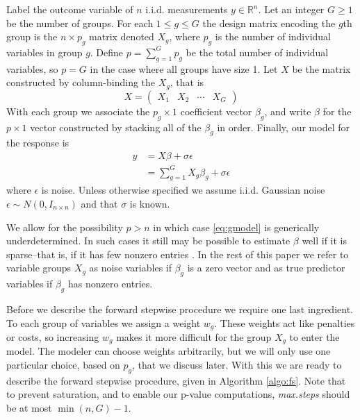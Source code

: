 \documentclass{imsart}
\newcommand{\todo}{\textcolor{red}{\textbf{To do: }}}
\newcommand{\real}{\mathbb{R}}
\begin{document}
Label the outcome variable of $n$ i.i.d. measurements $y \in \real^n$. Let an integer $G \geq 1$ 
be the number of groups. For each $1 \leq g \leq G$ the design matrix encoding the
$g$th group is the $n \times p_g$ matrix denoted $X_g$, where $p_g$ is
the number of individual variables in group $g$. Define $p = \sum_{g=1}^G
p_g$ be the total number of individual variables, so $p = G$ in the
case where all groups have size 1. Let $X$ be the matrix constructed
by column-binding the $X_g$, that is  
\begin{equation*}
X = \begin{pmatrix} X_1 & X_2 & \cdots & X_G  \end{pmatrix}
\end{equation*}
With each group we associate the $p_g \times 1$ coefficient vector
$\beta_g$, and write $\beta$ for the $p \times 1$ vector constructed
by stacking all of the $\beta_g$ in order.  Finally, our model for the
response is
\begin{equation}
\begin{aligned}
\label{eq:gmodel}
y & = X \beta + \sigma \epsilon \\
   & = \sum_{g=1}^G X_g \beta_g + \sigma \epsilon
\end{aligned}
\end{equation}
where $\epsilon$ is noise. Unless otherwise specified we assume
i.i.d. Gaussian noise $\epsilon \sim N(0, I_{n \times n})$ and that
$\sigma$ is known.

We allow for the possibility $p > n$ in which case \ref{eq:gmodel} is
generically underdetermined. In such cases it still may be possible to
estimate $\beta$ well if it is sparse--that is, if it has few nonzero
entries \citep{donoho:pursuit}. In the rest of this paper we refer to
variable groups $X_g$ as noise variables if $\beta_g$ is a zero vector
and as true predictor variables if $\beta_g$ has nonzero entries.

Before we describe the forward stepwise procedure we require one last
ingredient. To each group of variables we assign a weight $w_g$. These
weights act like penalties or costs, so increasing $w_g$ makes it
more difficult for the group $X_g$ to enter the model. The
modeler can choose weights arbitrarily, but we will only use one
particular choice, based on $p_g$, that we discuss later. With this we
are ready to describe the forward stepwise procedure, given in Algorithm
\ref{algo:fs}. Note that to prevent saturation, and to enable our p-value
computations, \textit{max.steps} should be at most $\min (n, G) - 1$. 
\end{document}
